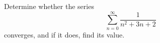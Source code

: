 Determine whether the series
\[
\sum_{n=0}^{\infty}\dfrac{1}{n^2+3n+2}
\]
converges, and if it does, find its value.
